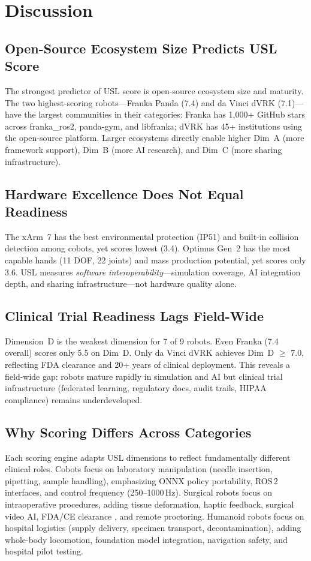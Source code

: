 \documentclass[11pt,a4paper]{article}
\begin{document}
\section{Discussion}
\label{sec:discussion}

\subsection{Open-Source Ecosystem Size Predicts USL Score}
The strongest predictor of USL score is open-source ecosystem size and maturity. The two highest-scoring robots---Franka Panda (7.4) and da Vinci dVRK (7.1)---have the largest communities in their categories: Franka has 1,000+ GitHub stars across franka\_ros2, panda-gym, and libfranka; dVRK has 45+ institutions using the open-source platform. Larger ecosystems directly enable higher Dim~A (more framework support), Dim~B (more AI research), and Dim~C (more sharing infrastructure).

\subsection{Hardware Excellence Does Not Equal Readiness}
The xArm~7 has the best environmental protection (IP51) and built-in collision detection among cobots, yet scores lowest (3.4). Optimus Gen~2 has the most capable hands (11 DOF, 22 joints) and mass production potential, yet scores only 3.6. USL measures \emph{software interoperability}---simulation coverage, AI integration depth, and sharing infrastructure---not hardware quality alone.

\subsection{Clinical Trial Readiness Lags Field-Wide}
Dimension~D is the weakest dimension for 7 of 9 robots. Even Franka (7.4 overall) scores only 5.5 on Dim~D. Only da Vinci dVRK achieves Dim~D $\geq$ 7.0, reflecting FDA clearance and 20+ years of clinical deployment. This reveals a field-wide gap: robots mature rapidly in simulation and AI but clinical trial infrastructure (federated learning, regulatory docs, audit trails, HIPAA compliance) remains underdeveloped.

\subsection{Why Scoring Differs Across Categories}
Each scoring engine adapts USL dimensions to reflect fundamentally different clinical roles. Cobots focus on laboratory manipulation (needle insertion, pipetting, sample handling), emphasizing ONNX policy portability, ROS\,2 interfaces, and control frequency (250--1000\,Hz). Surgical robots focus on intraoperative procedures, adding tissue deformation, haptic feedback, surgical video AI, FDA/CE clearance \cite{fda2025aiml}, and remote proctoring. Humanoid robots focus on hospital logistics (supply delivery, specimen transport, decontamination), adding whole-body locomotion, foundation model integration, navigation safety, and hospital pilot testing.
\end{document}
